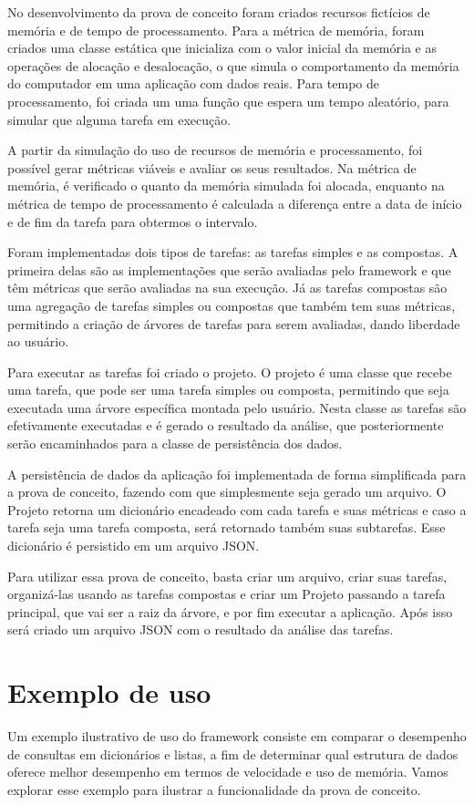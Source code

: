 \documentclass[12pt]{tcc}
\begin{document}
No desenvolvimento da prova de conceito foram criados recursos fictícios de memória e de tempo de processamento. Para a métrica de memória, foram criados uma classe estática que inicializa com o valor inicial da memória e as operações de alocação e desalocação, o que simula o comportamento da memória do computador em uma aplicação com dados reais. Para tempo de processamento, foi criada um uma função que espera um tempo aleatório, para simular que alguma tarefa em execução.

A partir da simulação do uso de recursos de memória e processamento, foi possível gerar métricas viáveis e avaliar os seus resultados. Na métrica de memória, é verificado o quanto da memória simulada foi alocada, enquanto na métrica de tempo de processamento é calculada a diferença entre a data de início e de fim da tarefa para obtermos o intervalo. 

Foram implementadas dois tipos de tarefas: as tarefas simples e as compostas. A primeira delas são as implementações que serão avaliadas pelo framework e que têm métricas que serão avaliadas na sua execução. Já as tarefas compostas são uma agregação de tarefas simples ou compostas que também tem suas métricas, permitindo a criação de árvores de tarefas para serem avaliadas, dando liberdade ao usuário.

Para executar as tarefas foi criado o projeto. O projeto é uma classe que recebe uma tarefa, que pode ser uma tarefa simples ou composta, permitindo que seja executada uma árvore específica montada pelo usuário. Nesta classe as tarefas são efetivamente executadas e é gerado o resultado da análise, que posteriormente serão encaminhados para a classe de persistência dos dados.

A persistência de dados da aplicação foi implementada de forma simplificada para a prova de conceito, fazendo com que simplesmente seja gerado um arquivo. O Projeto retorna um dicionário encadeado com cada tarefa e suas métricas e caso a tarefa seja uma tarefa composta, será retornado também suas subtarefas. Esse dicionário é persistido em um arquivo JSON. 

Para utilizar essa prova de conceito, basta criar um arquivo, criar suas tarefas, organizá-las usando as tarefas compostas e criar um Projeto passando a tarefa principal, que vai ser a raiz da árvore, e por fim executar a aplicação. Após isso será criado um arquivo JSON com o resultado da análise das tarefas.

\section{Exemplo de uso}
Um exemplo ilustrativo de uso do framework consiste em comparar o desempenho de consultas em dicionários e listas, a fim de determinar qual estrutura de dados oferece melhor desempenho em termos de velocidade e uso de memória. Vamos explorar esse exemplo para ilustrar a funcionalidade da prova de conceito.
\end{document}

